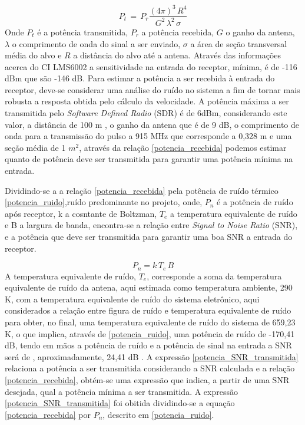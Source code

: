 \begin{equation}\label{potencia_recebida}
    P_t\, =\,   P_r \frac{(4\pi)^{3}\,  R^{4}}{G^{2}\,   \lambda^{2}\, \sigma }  
\end{equation}%
Onde $P_t$ é a potência transmitida, $P_r$ a potência recebida, $G$ o ganho da antena, $\lambda$ o comprimento de onda do sinal a ser enviado, $\sigma$ a área de seção transversal média do alvo e $R$ a distância do alvo até a antena.
Através das informações acerca do CI LMS6002 a sensitividade na entrada do receptor, mínima, é de -116 dBm que são -146 dB. Para estimar a potência a ser recebida à entrada do receptor, deve-se considerar uma análise do ruído no sistema a fim de tornar mais robusta a resposta obtida pelo cálculo da velocidade.
A potência máxima a ser transmitida pelo  \emph{Software Defined Radio} (SDR) é de 6dBm, considerando este valor, a distância de 100 m , o ganho da antena que é de 9 dB, o comprimento de onda para a transmissão do pulso a 915 MHz que corresponde a 0,328 m e uma seção média de 1 $m^2$, através da relação \ref{potencia_recebida} podemos estimar quanto de potência deve ser transmitida para garantir uma potência mínima na entrada.


Dividindo-se a a relação \ref{potencia_recebida} pela potência de ruído térmico \ref{potencia_ruido},ruído predominante no projeto, onde, $P_n$ é a potência de ruído após receptor, k a cosntante de Boltzman, $T_e$ a temperatura equivalente de ruído e B a largura de banda, encontra-se a relação entre \emph{Signal to Noise Ratio} (SNR), e a potência que deve ser transmitida para garantir uma boa SNR a entrada do receptor.

\begin{equation}\label{potencia_ruido}
    P_n = k\, T_e\,B
\end{equation}
A temperatura equivalente de ruído, $T_e$, corresponde a soma da temperatura equivalente de ruído da antena, aqui estimada como temperatura ambiente, 290 K, com a temperatura equivalente de ruído do sistema eletrônico, aqui considerados a relação entre figura de ruído e temperatura equivalente de ruído para obter, no final, uma temperatura equivalente de ruído do sistema de 659,23 K, o que implica, através de \ref{potencia_ruido}, uma potência de ruído de -170,41 dB, tendo em mãos a potência de ruído e a potência de sinal na entrada a SNR será de , aproximadamente, 24,41 dB .
A expressão \ref{potencia_SNR_transmitida} relaciona a potência a ser transmitida considerando a SNR calculada e a relação \ref{potencia_recebida}, obtém-se uma expressão que indica, a partir de uma SNR desejada, qual a potência mínima a ser transmitida. A expressão \ref{potencia_SNR_transmitida} foi obitida dividindo-se a equação \ref{potencia_recebida} por $P_n$, descrito em \ref{potencia_ruido}.%

